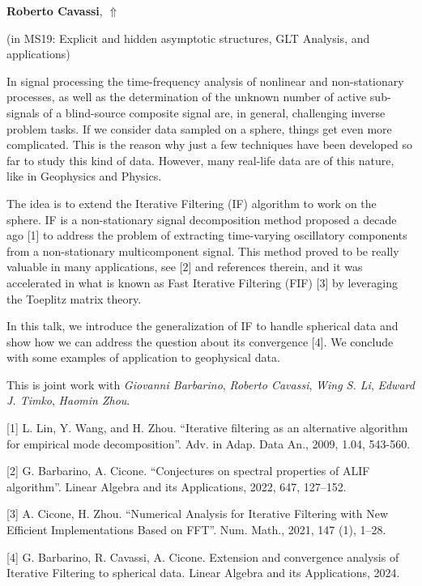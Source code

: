 \documentclass[ILAS2025-program.tex]{subfiles}
\begin{document}
\hypertarget{down0217}{}\begin{ilasabstract}
    
\textbf{Roberto Cavassi},  \hfill \hyperlink{up0217}{$\Uparrow$}
    
    
(in {\color{mstitle}MS19: Explicit and hidden asymptotic structures, GLT Analysis, and applications})
        
\mtskip
    In signal processing the time-frequency analysis of nonlinear and non-stationary processes, as well as the determination of the unknown number of active sub-signals of a blind-source composite signal are, in general, challenging inverse problem tasks. If we consider data sampled on a sphere, things get even more complicated. This is the reason why just a few techniques have been developed so far to study this kind of data. However, many real-life data are of this nature, like in Geophysics and Physics.

The idea is to extend the Iterative Filtering (IF) algorithm to work on the sphere. IF is a non-stationary signal decomposition method proposed a decade ago [1] to address the problem of extracting time-varying oscillatory components from a non-stationary multicomponent signal. This method proved to be really valuable in many applications, see [2] and references therein, and it was accelerated in what is known as Fast Iterative Filtering (FIF) [3] by leveraging the Toeplitz matrix theory.

In this talk, we introduce the generalization of IF to handle spherical data and show how we can address the question about its convergence [4]. We conclude with some examples of application to geophysical data.

This is joint work with {\em Giovanni Barbarino}, {\em Roberto Cavassi}, {\em Wing S. Li}, {\em Edward J. Timko}, {\em Haomin Zhou}.

[1] L. Lin, Y. Wang, and H. Zhou. ``Iterative filtering as an alternative algorithm for empirical mode decomposition''. Adv. in Adap. Data An., 2009, 1.04, 543-560.

[2] G. Barbarino, A. Cicone. ``Conjectures on spectral properties of ALIF algorithm''. Linear Algebra and its Applications, 2022, 647, 127--152.

[3] A. Cicone, H. Zhou. ``Numerical Analysis for Iterative Filtering with New Efficient Implementations Based on FFT''. Num. Math., 2021, 147 (1), 1--28.

[4] G. Barbarino, R. Cavassi, A. Cicone. Extension and convergence analysis of Iterative Filtering to spherical data. Linear Algebra and its Applications, 2024.


\end{ilasabstract}
    
\end{document}
